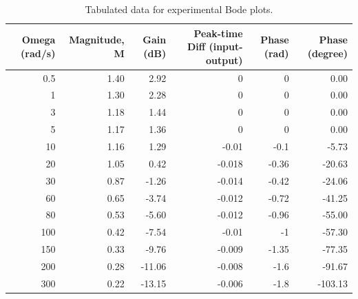 \documentclass[letterpaper, 11pt, openany]{book}
\begin{document}
\begin{enumerate}
\begin{table}[htbp]
  \centering
  \caption{Tabulated data  for experimental Bode plots. }
    \begin{tabular}{|r|r|r|r|r|r|}
    \toprule
    \multicolumn{1}{|p{3.28em}|}{\textbf{Omega (rad/s)}} & \multicolumn{1}{p{6.445em}|}{\textbf{Magnitude, M}} & \multicolumn{1}{p{4.28em}|}{\textbf{Gain (dB)}} & \multicolumn{1}{p{6.61em}|}{\textbf{Peak-time Diff (input-output)}} & \multicolumn{1}{p{5.11em}|}{\textbf{Phase (rad)}} & \multicolumn{1}{p{6.89em}|}{\textbf{Phase (degree)}} \\
    \midrule
    0.5   & 1.40  & 2.92  & 0     & 0     & 0.00 \\
    \midrule
    1     & 1.30  & 2.28  & 0     & 0     & 0.00 \\
    \midrule
    3     & 1.18  & 1.44  & 0     & 0     & 0.00 \\
    \midrule
    5     & 1.17  & 1.36  & 0     & 0     & 0.00 \\
    \midrule
    10    & 1.16  & 1.29  & -0.01 & -0.1  & -5.73 \\
    \midrule
    20    & 1.05  & 0.42  & -0.018 & -0.36 & -20.63 \\
    \midrule
    30    & 0.87  & -1.26 & -0.014 & -0.42 & -24.06 \\
    \midrule
    60    & 0.65  & -3.74 & -0.012 & -0.72 & -41.25 \\
    \midrule
    80    & 0.53  & -5.60 & -0.012 & -0.96 & -55.00 \\
    \midrule
    100   & 0.42  & -7.54 & -0.01 & -1    & -57.30 \\
    \midrule
    150   & 0.33  & -9.76 & -0.009 & -1.35 & -77.35 \\
    \midrule
    200   & 0.28  & -11.06 & -0.008 & -1.6  & -91.67 \\
    \midrule
    300   & 0.22  & -13.15 & -0.006 & -1.8  & -103.13 \\
    \bottomrule
    \end{tabular}%
  \label{tab:BodeData}%
\end{table}%




\end{enumerate}
\end{document}
